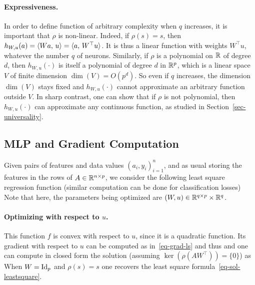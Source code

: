 \paragraph{Expressiveness. }

In order to define function of arbitrary complexity when $q$ increases, it is important that $\rho$ is non-linear. Indeed, if $\rho(s)=s$, then $h_{W,u}(a) = \langle Wa,\,u\rangle = \langle a,\,W^\top u\rangle$. It is thus a linear function with weights $W^\top u$, whatever the number $q$ of neurons.  
%
Similarly, if $\rho$ is a polynomial on $\mathbb{R}$ of degree $d$, then $h_{W,u}(\cdot)$ is itself a polynomial of degree $d$ in $\mathbb{R}^p$, which is a linear space $V$ of finite dimension $\dim(V) = O(p^d)$. So even if $q$ increases, the dimension $\dim(V)$ stays fixed and  $h_{W,u}(\cdot)$ cannot approximate an arbitrary function outside $V$. 
%
In sharp contrast, one can show that if $\rho$ is not polynomial, then $h_{W,u}(\cdot)$ can approximate any continuous function, as studied in Section~\ref{sec-universality}. 

\subsection{MLP and Gradient Computation}

Given pairs of features and data values $(a_i,y_i)_{i=1}^n$, and as usual storing the features in the rows of $A \in \mathbb{R}^{n \times p}$, we consider the following least square regression function (similar computation can be done for classification losses)
Note that here, the parameters being optimized are $(W,u) \in \mathbb{R}^{q \times p} \times \mathbb{R}^q$.

\paragraph{Optimizing with respect to $u$.}

This function $f$ is convex with respect to $u$, since it is a quadratic function. Its gradient with respect to $u$ can be computed as in~\eqref{eq-grad-ls} and thus
and one can compute in closed form the solution (assuming $\ker(\rho(AW^\top))=\{0\}$) as 
When $W=\mathrm{Id}_p$ and $\rho(s)=s$ one recovers the least square formula~\eqref{eq-sol-leastsquare}.

